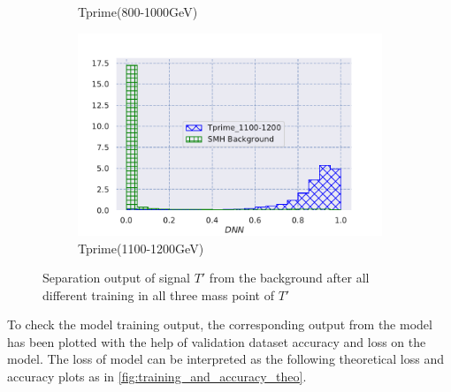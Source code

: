 \begin{figure}[H]
\begin{subfigure}[b]{0.47\textwidth}
         \caption{Tprime(800-1000GeV)}
         \label{fig:three sin x}
     \end{subfigure}
     \hfill
     \begin{subfigure}[b]{0.47\textwidth}
         \centering
         \includegraphics[width=\textwidth]{figure_4/Training_with_Tprime_1100-1200GeV_ with_backgrounds.pdf}
         \caption{Tprime(1100-1200GeV)}
         \label{fig:five over x}
     \end{subfigure}
        \caption{Separation output of signal $T{'}$ from the background after all different training in all three mass point of $T{'}$}
        \label{fig:output_training_models}
\end{figure}


To check the model training output, the corresponding output from the model has been plotted with the help of validation dataset accuracy and loss on the model. The loss of model can be interpreted as the following theoretical loss and accuracy plots as in \autoref{fig:training_and_accuracy_theo}.

